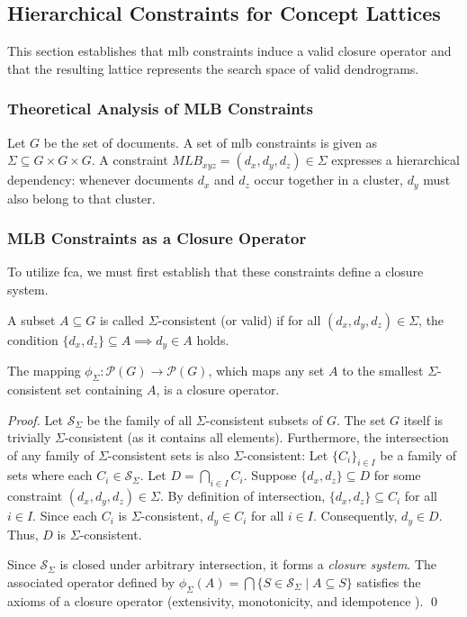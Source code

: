 \subsection{Hierarchical Constraints for Concept Lattices}
\label{sec:constrained_latticed}

This section establishes that \ac{mlb} constraints induce a valid closure operator and that the resulting lattice represents the search space of valid dendrograms.

\subsubsection{Theoretical Analysis of MLB Constraints}
Let $G$ be the set of documents. A set of \ac{mlb} constraints is given as $\Sigma \subseteq G \times G \times G$. A constraint $MLB_{x y z} = (d_x, d_y, d_z) \in \Sigma$ expresses a hierarchical dependency: whenever documents $d_x$ and $d_z$ occur together in a cluster, $d_y$ must also belong to that cluster.

\subsubsection{MLB Constraints as a Closure Operator}
To utilize \ac{fca}, we must first establish that these constraints define a closure system.

\begin{definition}
A subset $A \subseteq G$ is called $\Sigma$-consistent (or valid) if for all $(d_x, d_y, d_z) \in \Sigma$, the condition $\{d_x, d_z\} \subseteq A \implies d_y \in A$ holds.
\end{definition}

\begin{theorem}
The mapping $\phi_{\Sigma}: \mathcal{P}(G) \to \mathcal{P}(G)$, which maps any set $A$ to the smallest $\Sigma$-consistent set containing $A$, is a closure operator.
\end{theorem}

\begin{proof}
Let $\mathcal{S}_{\Sigma}$ be the family of all $\Sigma$-consistent subsets of $G$. The set $G$ itself is trivially $\Sigma$-consistent (as it contains all elements). Furthermore, the intersection of any family of $\Sigma$-consistent sets is also $\Sigma$-consistent:
Let $\{C_i\}_{i \in I}$ be a family of sets where each $C_i \in \mathcal{S}_{\Sigma}$. Let $D = \bigcap_{i \in I} C_i$.
Suppose $\{d_x, d_z\} \subseteq D$ for some constraint $(d_x, d_y, d_z) \in \Sigma$. By definition of intersection, $\{d_x, d_z\} \subseteq C_i$ for all $i \in I$. Since each $C_i$ is $\Sigma$-consistent, $d_y \in C_i$ for all $i \in I$. Consequently, $d_y \in D$. Thus, $D$ is $\Sigma$-consistent.

Since $\mathcal{S}_{\Sigma}$ is closed under arbitrary intersection, it forms a \emph{closure system}. The associated operator defined by $\phi_{\Sigma}(A) = \bigcap \{ S \in \mathcal{S}_{\Sigma} \mid A \subseteq S \}$ satisfies the axioms of a closure operator (extensivity, monotonicity, and idempotence \cite{fca-book}).
\qed
\end{proof}


